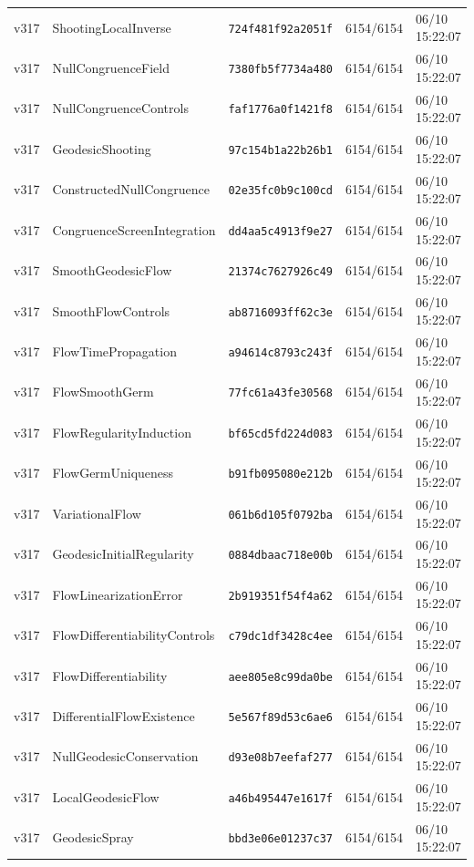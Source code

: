 \documentclass[11pt]{article}
\theoremstyle{definition}\newtheorem{deriv}{Derivation}
\begin{document}
{\begin{longtable}{@{}lllll@{}}
v317 & ShootingLocalInverse & \texttt{724f481f92a2051f} & 6154/6154 & 06/10 15:22:07 \\
v317 & NullCongruenceField & \texttt{7380fb5f7734a480} & 6154/6154 & 06/10 15:22:07 \\
v317 & NullCongruenceControls & \texttt{faf1776a0f1421f8} & 6154/6154 & 06/10 15:22:07 \\
v317 & GeodesicShooting & \texttt{97c154b1a22b26b1} & 6154/6154 & 06/10 15:22:07 \\
v317 & ConstructedNullCongruence & \texttt{02e35fc0b9c100cd} & 6154/6154 & 06/10 15:22:07 \\
v317 & CongruenceScreenIntegration & \texttt{dd4aa5c4913f9e27} & 6154/6154 & 06/10 15:22:07 \\
v317 & SmoothGeodesicFlow & \texttt{21374c7627926c49} & 6154/6154 & 06/10 15:22:07 \\
v317 & SmoothFlowControls & \texttt{ab8716093ff62c3e} & 6154/6154 & 06/10 15:22:07 \\
v317 & FlowTimePropagation & \texttt{a94614c8793c243f} & 6154/6154 & 06/10 15:22:07 \\
v317 & FlowSmoothGerm & \texttt{77fc61a43fe30568} & 6154/6154 & 06/10 15:22:07 \\
v317 & FlowRegularityInduction & \texttt{bf65cd5fd224d083} & 6154/6154 & 06/10 15:22:07 \\
v317 & FlowGermUniqueness & \texttt{b91fb095080e212b} & 6154/6154 & 06/10 15:22:07 \\
v317 & VariationalFlow & \texttt{061b6d105f0792ba} & 6154/6154 & 06/10 15:22:07 \\
v317 & GeodesicInitialRegularity & \texttt{0884dbaac718e00b} & 6154/6154 & 06/10 15:22:07 \\
v317 & FlowLinearizationError & \texttt{2b919351f54f4a62} & 6154/6154 & 06/10 15:22:07 \\
v317 & FlowDifferentiabilityControls & \texttt{c79dc1df3428c4ee} & 6154/6154 & 06/10 15:22:07 \\
v317 & FlowDifferentiability & \texttt{aee805e8c99da0be} & 6154/6154 & 06/10 15:22:07 \\
v317 & DifferentialFlowExistence & \texttt{5e567f89d53c6ae6} & 6154/6154 & 06/10 15:22:07 \\
v317 & NullGeodesicConservation & \texttt{d93e08b7eefaf277} & 6154/6154 & 06/10 15:22:07 \\
v317 & LocalGeodesicFlow & \texttt{a46b495447e1617f} & 6154/6154 & 06/10 15:22:07 \\
v317 & GeodesicSpray & \texttt{bbd3e06e01237c37} & 6154/6154 & 06/10 15:22:07 \\

\end{longtable}}
\end{document}

